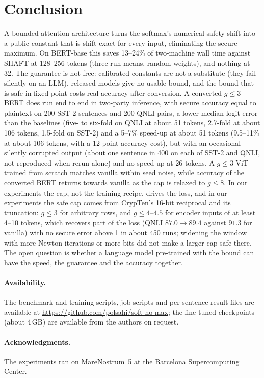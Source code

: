 \documentclass[11pt]{article}
\begin{document}
\section{Conclusion}
A bounded attention architecture turns the softmax's numerical-safety shift into a public constant that is
shift-exact for every input, eliminating the secure maximum. On BERT-base this saves 13--24\% of two-machine
wall time against SHAFT at 128--256 tokens (three-run means, random weights), and nothing at 32. The guarantee is not free: calibrated
constants are not a substitute (they fail silently on an LLM), released models give no usable bound, and
the bound that is safe in fixed point costs real accuracy after conversion. A converted $g\le3$ BERT does run end to end in
two-party inference, with secure accuracy equal to plaintext on 200 SST-2 sentences and 200 QNLI pairs, a lower median logit
error than the baselines (five- to six-fold on QNLI at about 51 tokens, 2.7-fold at about 106 tokens, 1.5-fold on SST-2) and a 5--7\% speed-up at about 51 tokens (9.5--11\% at about 106 tokens, with a 12-point accuracy cost), but with an occasional silently corrupted output (about one sentence in 400
on each of SST-2 and QNLI, not reproduced when rerun alone) and no speed-up at 26 tokens. A $g\le3$ ViT trained from scratch matches vanilla within seed noise,
while accuracy of the converted BERT returns towards vanilla as the cap is relaxed to $g\le8$. In our experiments the cap, not the training recipe, drives the loss, and in our experiments the safe cap comes from CrypTen's 16-bit reciprocal and its truncation: $g\le3$ for arbitrary rows, and $g\le4$--$4.5$ for encoder inputs of at least 4--10 tokens, which recovers part of the loss (QNLI $87.0\to89.4$ against $91.3$ for vanilla) with no secure error above 1 in about 450 runs; widening the window with more Newton iterations or more bits did not make a larger cap safe there. The open question is whether a language model
pre-trained with the bound can have the speed, the guarantee and the accuracy together.

\paragraph{Availability.} The benchmark and training scripts, job scripts and per-sentence result files are available at
\url{https://github.com/polsahi/soft-no-max}; the fine-tuned checkpoints (about 4\,GB) are available from the authors on request.

\paragraph{Acknowledgments.} The experiments ran on MareNostrum~5 at the Barcelona Supercomputing Center.



\end{document}
